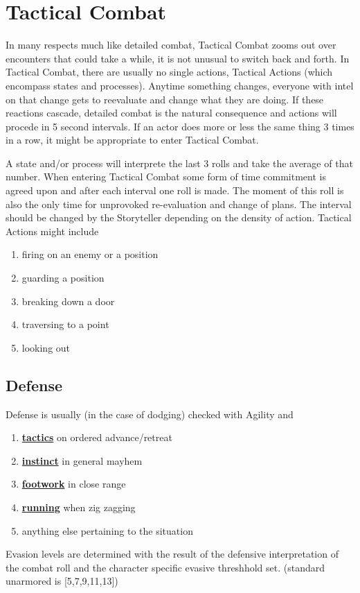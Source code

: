 \section{Tactical Combat}\label{sec:tactical-combat}
In many respects much like detailed combat, Tactical Combat zooms out over encounters that could take a while,
it is not unusual to switch back and forth.
In Tactical Combat, there are usually no single actions, Tactical Actions (which encompass states and processes).
Anytime something changes, everyone with intel on that change gets to reevaluate and change what they are doing.
If these reactions cascade, detailed combat is the natural consequence and actions will procede in 5 second intervals.
If an actor does more or less the same thing 3 times in a row, it might be appropriate to enter Tactical Combat.\par
A state and/or process will interprete the last 3 rolls and take the average of that number.
When entering Tactical Combat some form of time commitment is agreed upon and after each interval one roll is made.
The moment of this roll is also the only time for unprovoked re-evaluation and change of plans.
The interval should be changed by the Storyteller depending on the density of action.
Tactical Actions might include \par
\begin{enumerate}
    \item firing on an enemy or a position
    \item guarding a position
    \item breaking down a door
    \item traversing to a point
    \item looking out
\end{enumerate}

\subsection{Defense}\label{subsec:defense}
Defense is usually (in the case of dodging) checked with Agility and
\begin{enumerate}[label = - ]
    \item \hyperref[subsec:tactics]{\textbf{tactics}} on ordered advance/retreat
    \item \hyperref[subsec:instinct]{\textbf{instinct}} in general mayhem
    \item \hyperref[subsec:footwork]{\textbf{footwork}} in close range
    \item \hyperref[subsec:running]{\textbf{running}} when zig zagging
    \item anything else pertaining to the situation
\end{enumerate}
Evasion levels are determined with the result of the defensive interpretation of the combat roll
and the character specific evasive threshhold set. (standard unarmored is [5,7,9,11,13])

